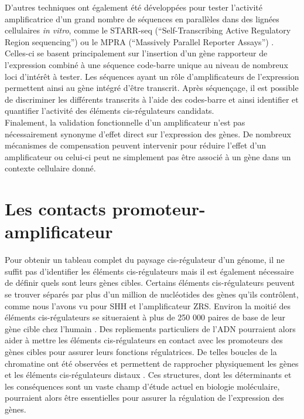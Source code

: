 D’autres techniques ont également été développées pour tester l'activité amplificatrice d'un grand nombre de séquences en parallèles dans des lignées cellulaires \textit{in vitro}, comme le STARR-seq (“Self-Transcribing Active Regulatory Region sequencing”) ou le MPRA (“Massively Parallel Reporter Assays”) \citep{arnold_quantitative_2014, inoue_decoding_2015}. Celles-ci se basent principalement sur l’insertion d’un gène rapporteur de l’expression combiné à une séquence code-barre unique au niveau de nombreux loci d’intérêt à tester. Les séquences ayant un rôle d’\glspl{amplificateur} de l’expression permettent ainsi au gène intégré d’être transcrit. Après séquençage, il est possible de discriminer les différents transcrits à l’aide des codes-barre et ainsi identifier et quantifier l’activité des éléments \gls{cis}-régulateurs candidats. \\

Finalement, la validation fonctionnelle d’un \gls{amplificateur} n’est pas nécessairement synonyme d’effet direct sur l’expression des gènes. De nombreux mécanismes de compensation peuvent intervenir pour réduire l’effet d’un \gls{amplificateur} ou celui-ci peut ne simplement pas être associé à un gène dans un contexte cellulaire donné.

\section{Les contacts promoteur-amplificateur}
\label{sec:contact}

Pour obtenir un tableau complet du paysage \gls{cis}-régulateur d'un génome, il ne suffit pas d'identifier les éléments \gls{cis}-régulateurs mais il est également nécessaire de définir quels sont leurs gènes cibles. Certains éléments \gls{cis}-régulateurs peuvent se trouver séparés par plus d'un million de nucléotides des gènes qu’ils contrôlent, comme nous l’avons vu pour \acrshort{SHH} et l’\gls{amplificateur} \acrshort{ZRS}. Environ la moitié des éléments \gls{cis}-régulateurs se situeraient à plus de 250 000 paires de base de leur gène cible chez l’humain \citep{montavon_regulatory_2011}. Des repliements particuliers de l’ADN pourraient alors aider à mettre les éléments \gls{cis}-régulateurs en contact avec les promoteurs des gènes cibles pour assurer leurs fonctions régulatrices. De telles boucles de la chromatine ont été observées et permettent de rapprocher physiquement les gènes et les éléments \gls{cis}-régulateurs distaux \citep{tolhuis_looping_2002}. Ces structures, dont les déterminants et les conséquences sont un vaste champ d'étude actuel en biologie moléculaire, pourraient alors être essentielles pour assurer la régulation de l’expression des gènes.

